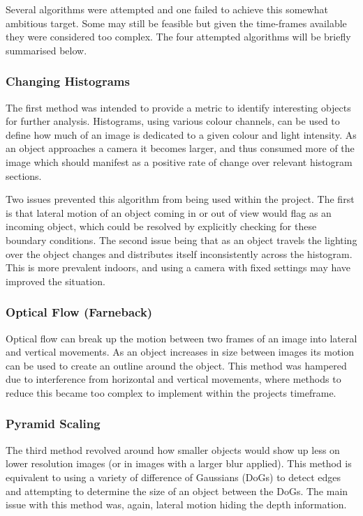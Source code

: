 \documentclass[conference]{IEEEtran}
\begin{document}
Several algorithms were attempted and one failed to achieve this somewhat ambitious target. Some may still be feasible but given the time-frames available they were considered too complex. The four attempted algorithms will be briefly summarised below.

\subsubsection{Changing Histograms}
The first method was intended to provide a metric to identify interesting objects for further analysis. Histograms, using various colour channels, can be used to define how much of an image is dedicated to a given colour and light intensity. As an object approaches a camera it becomes larger, and thus consumed more of the image which should manifest as a positive rate of change over relevant histogram sections.

Two issues prevented this algorithm from being used within the project. The first is that lateral motion of an object coming in or out of view would flag as an incoming object, which could be resolved by explicitly checking for these boundary conditions. The second issue being that as an object travels the lighting over the object changes and distributes itself inconsistently across the histogram. This is more prevalent indoors, and using a camera with fixed settings may have improved the situation.

\subsubsection{Optical Flow (Farneback)}
Optical flow can break up the motion between two frames of an image into lateral and vertical movements. As an object increases in size between images its motion can be used to create an outline around the object. This method was hampered due to interference from horizontal and vertical movements, where methods to reduce this became too complex to implement within the projects timeframe.

\subsubsection{Pyramid Scaling}
The third method revolved around how smaller objects would show up less on lower resolution images (or in images with a larger blur applied). This method is equivalent to using a variety of difference of Gaussians (DoGs) to detect edges and attempting to determine the size of an object between the DoGs. The main issue with this method was, again, lateral motion hiding the depth information.
\end{document}
